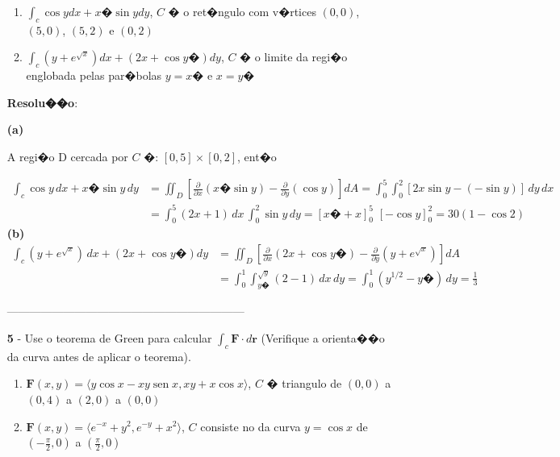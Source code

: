 \documentclass[12pt]{article}
\DeclareMathOperator{\sen}{sen}
\begin{document}
\begin{enumerate}
          \begin{enumerate}
              \item $\int_c \cos ydx + x� \sin y dy$, $C$ � o ret�ngulo com v�rtices $(0,0)$, $(5,0)$, $(5,2)$ e $(0,2)$
              \item $\int_c (y+ e^{\sqrt{x}}) dx + (2x + \cos y�)dy$, $C$ � o limite da regi�o englobada pelas par�bolas $y=x�$ e $x=y�$
          \end{enumerate}

          \textbf{Resolu��o}:

          \textbf{(a)}

          A regi�o D cercada por $C$ �: $[0,5] \times [0,2]$, ent�o

          \begin{align*}
              \int_{c}\cos y\,dx + x�\sin y\,dy & =\iint_{D} \left[\frac{\partial}{\partial x}(x� \sin y) - \frac{\partial}{\partial y}(\cos y)\right]dA=  \int_0^5 \int_0^2[2x \sin y - (-\sin y)]\,dy\,dx \\&=\int_0^5 (2x+1)\,dx\,\int_0^2 \sin y \,dy = \left[x�+x \right]_0^5 \,\, \left[-\cos y \right]_0^2 = 30(1- \cos 2)
          \end{align*}
          \textbf{(b)}
          \begin{align*}
              \int_c (y+ e^{\sqrt{x}})\,dx + (2x + \cos y�)dy & = \iint_{D} \left[\frac{\partial}{\partial x}(2x + \cos y�) - \frac{\partial}{\partial y}(y+ e^{\sqrt{x}})\right]dA \\&= \int_0^1 \int_{y�}^{\sqrt{y}} (2-1)\,dx\,dy = \int_0^1 (y^{1/2}-y�)\,dy = \frac{1}{3}
          \end{align*}
          \begin{center}
              ---------------------------------------------------------------
          \end{center}
    \item[\textbf{5}]- Use o teorema de Green para calcular $\int_c \textbf{F}\cdot d\textbf{r} $ (Verifique a orienta��o da curva antes de aplicar o teorema).
          \begin{enumerate}
              \item $\textbf{F}(x,y)= \langle y\cos x - xy\sen x, xy + x\cos x \rangle $, $C$ � triangulo de $(0,0)$ a $(0,4)$ a $(2,0)$ a $(0,0)$
              \item $\textbf{F}(x,y)= \langle e^{-x} + y^2, e^{-y} + x^2 \rangle $, $C$ consiste no da curva $y = \cos x $ de $(-\frac{\pi}{2},0)$ a $(\frac{\pi}{2},0)$
          \end{enumerate}


\end{enumerate}
\end{document}
